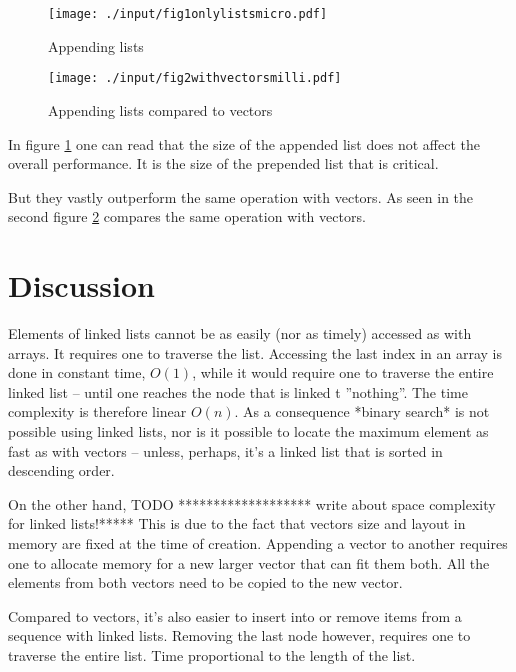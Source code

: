 \documentclass[a4paper, 11pt]{article}
\begin{document}
    \begin{figure}[h]
        \centering
        \texttt{[image: ./input/fig1onlylistsmicro.pdf]}
        \caption{Appending lists}
        \label{fig:appendlists}
    \end{figure}

    \begin{figure}[h]
        \centering
        \texttt{[image: ./input/fig2withvectorsmilli.pdf]}
        \caption{Appending lists compared to vectors}
        \label{fig:appendlistscomparedtovectors}
    \end{figure}

    In figure \ref{fig:appendlists} one can read that the size of the appended list
    does not affect the overall performance. It is the size of the prepended list that is critical. 
    
    But they vastly outperform the same operation with vectors. 
    As seen in the second figure \ref{fig:appendlistscomparedtovectors}
    compares the same operation with vectors. 

    \clearpage
    \section*{Discussion}

Elements of linked lists cannot be as easily (nor as timely) accessed as with arrays. 
It requires one to traverse the list. 
Accessing the last index in an array is done in constant time, $O(1)$, 
while it would require one to traverse the entire linked list -- until one
reaches the node that is linked t ''nothing''. 
The time complexity is therefore linear $O(n)$.
As a consequence *binary search* is not possible using linked lists, 
nor is it possible to locate the maximum element as fast as with vectors 
-- unless, perhaps, it's a linked list that is sorted in descending order.  

On the other hand, TODO ******************* write about space complexity for linked lists!*****
This is due to the fact that vectors size and layout in memory are fixed at the 
time of creation. 
Appending a vector to another requires one to allocate memory for a new larger vector 
that can fit them both. 
All the elements from both vectors need to be copied to the new vector. 

Compared to vectors, it's also easier to insert into or remove items from 
a sequence with linked lists. 
Removing the last node however, requires one to traverse the entire list. 
Time proportional to the length of the list.
\end{document}
